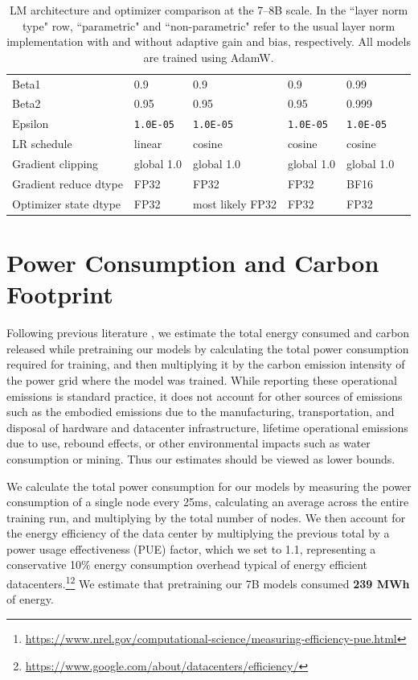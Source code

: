 \begin{table}[t]
\begin{tabular}{l|lllll}
        Beta1 & 0.9 & 0.9 & 0.9 & 0.99 \\
        Beta2 & 0.95 & 0.95 & 0.95 & 0.999 \\
        Epsilon & \texttt{1.0E-05} & \texttt{1.0E-05} & \texttt{1.0E-05} & \texttt{1.0E-05} \\
        LR schedule & linear & cosine & cosine & cosine \\
        Gradient clipping & global 1.0 & global 1.0 & global 1.0 & global 1.0 \\
        Gradient reduce dtype & FP32 & FP32 & FP32 & BF16 \\
        Optimizer state dtype & FP32 & most likely FP32 & FP32 & FP32 \\
        \bottomrule
    \end{tabular}
    \caption{LM architecture and optimizer comparison at the 7--8B scale. In the ``layer norm type" row, ``parametric" and ``non-parametric" refer to the usual layer norm implementation with and without adaptive gain and bias, respectively. All models are trained using AdamW.}
    \label{tab:llm_arch_adamw}
\end{table}





\section{Power Consumption and Carbon Footprint}
\label{sec:carbon}

Following previous literature \citep{strubell-etal-2019-energy, patterson2021carbon, wu2022sustainable, dodge2022measuring}, we estimate the total energy consumed and carbon released while pretraining our models by calculating the total power consumption required for training, and then multiplying it by the carbon emission intensity of the power grid where the model was trained. While reporting these operational emissions is standard practice, it does not account for other sources of emissions such as the embodied emissions due to the manufacturing, transportation, and disposal of hardware and datacenter infrastructure, lifetime operational emissions due to use, rebound effects, or other environmental impacts such as water consumption or mining. Thus our estimates should be viewed as lower bounds.

We calculate the total power consumption for our models by measuring the power consumption of a single node every 25ms, calculating an average across the entire training run, and multiplying by the total number of nodes. We then account for the energy efficiency of the data center by multiplying the previous total by a power usage effectiveness (PUE) factor, which we set to 1.1, representing a conservative 10\% energy consumption overhead typical of energy efficient datacenters.\footnote{\protect\url{https://www.nrel.gov/computational-science/measuring-efficiency-pue.html}}\footnote{\protect\url{https://www.google.com/about/datacenters/efficiency/}} We estimate that pretraining our 7B models consumed \textbf{239 MWh} of energy.

